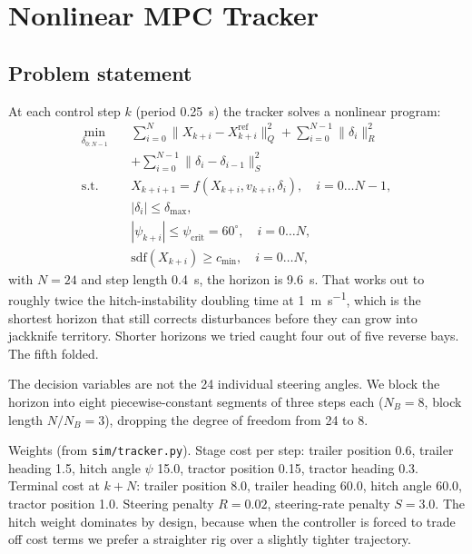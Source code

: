\documentclass[conference]{IEEEtran}
\begin{document}
\section{Nonlinear MPC Tracker}
\label{sec:nmpc}

\subsection{Problem statement}

At each control step $k$ (period \SI{0.25}{\second}) the tracker solves
a nonlinear program:
\begin{equation}
\begin{aligned}
    \min_{\delta_{0:N-1}} \quad & \sum_{i=0}^{N} \big\| X_{k+i} - X^{\mathrm{ref}}_{k+i} \big\|^{2}_{Q}
        + \sum_{i=0}^{N-1} \big\| \delta_{i} \big\|^{2}_{R} \\
        & + \sum_{i=0}^{N-1} \big\| \delta_{i} - \delta_{i-1} \big\|^{2}_{S} \\
    \text{s.t.} \quad & X_{k+i+1} = f(X_{k+i}, v_{k+i}, \delta_{i}),\quad i = 0 \ldots N-1, \\
                  & |\delta_{i}| \le \delta_{\max}, \\
                  & |\psi_{k+i}| \le \psi_{\mathrm{crit}} = 60^{\circ},\quad i = 0 \ldots N, \\
                  & \mathrm{sdf}(X_{k+i}) \ge c_{\min},\quad i = 0 \ldots N,
\end{aligned}
\label{eq:ocp}
\end{equation}
with $N = 24$ and step length \SI{0.4}{\second}, the horizon is
\SI{9.6}{\second}. That works out to roughly twice the hitch-instability
doubling time at \SI{1}{\meter\per\second}, which is the shortest horizon
that still corrects disturbances before they can grow into jackknife
territory. Shorter horizons we tried caught four out of five reverse
bays. The fifth folded.

The decision variables are not the 24 individual steering angles. We
block the horizon into eight piecewise-constant segments of three steps
each ($N_B = 8$, block length $N / N_B = 3$), dropping the degree of
freedom from 24 to 8.

Weights (from \texttt{sim/tracker.py}). Stage cost per step: trailer
position \num{0.6}, trailer heading \num{1.5}, hitch angle $\psi$
\num{15.0}, tractor position \num{0.15}, tractor heading \num{0.3}.
Terminal cost at $k + N$: trailer position \num{8.0}, trailer heading
\num{60.0}, hitch angle \num{60.0}, tractor position \num{1.0}.
Steering penalty $R = \num{0.02}$, steering-rate penalty $S = \num{3.0}$.
The hitch weight dominates by design, because when the controller is
forced to trade off cost terms we prefer a straighter rig over a
slightly tighter trajectory.
\end{document}
